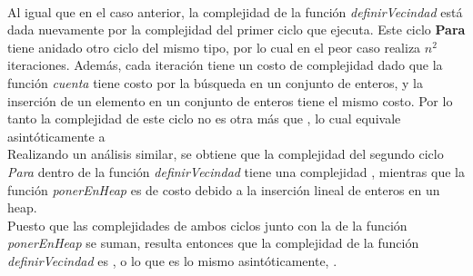 \paragraph{}
Al igual que en el caso anterior, la complejidad de la función \textit{definirVecindad} está dada nuevamente por la complejidad del primer ciclo que ejecuta. Este ciclo \textbf{Para} tiene anidado otro ciclo del mismo tipo, por lo cual en el peor caso realiza $n^2$ iteraciones. Además, cada iteración tiene un costo de complejidad  dado que la función \textit{cuenta} tiene costo  por la búsqueda en un conjunto de enteros, y la inserción de un elemento en un conjunto de enteros tiene el mismo costo. Por lo tanto la complejidad de este ciclo no es otra más que , lo cual equivale asintóticamente a  \\
Realizando un análisis similar, se obtiene que la complejidad del segundo ciclo \textit{Para} dentro de la función \textit{definirVecindad} tiene una complejidad , mientras que la función \textit{ponerEnHeap} es de costo  debido a la inserción lineal de enteros en un heap. \\
Puesto que las complejidades de ambos ciclos junto con la de la función \textit{ponerEnHeap} se suman, resulta entonces que la complejidad de la función \textit{definirVecindad} es , o lo que es lo mismo asintóticamente, .

